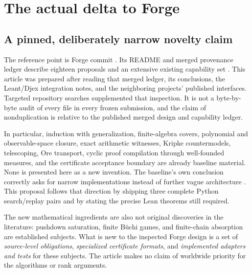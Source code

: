 \section{The actual delta to Forge}
\label{sec:delta}

\subsection{A pinned, deliberately narrow novelty claim}
The reference point is Forge commit
. Its README and merged
provenance ledger describe eighteen proposals and an extensive existing
capability set \cite{forge,forge-provenance}. This article was prepared after
reading that merged ledger, its conclusions, the Leant/Djex integration notes,
and the neighboring projects' published interfaces. Targeted repository
searches supplemented that inspection. It is not a byte-by-byte audit of every
file in every frozen submission, and the claim of nonduplication is relative to
the published merged design and capability ledger.

In particular, induction with generalization, finite-algebra covers, polynomial
and observable-space closure, exact arithmetic witnesses, Kripke countermodels,
telescoping, Ore transport, cyclic proof compilation through well-founded
measures, and the certificate acceptance boundary are already baseline
material. None is presented here as a new invention. The baseline's own
conclusion correctly asks for narrow implementations instead of further vague
architecture \cite{forge-conclusion}. This proposal follows that direction by
shipping three complete Python search/replay pairs and by stating the precise
Lean theorems still required.

The new mathematical ingredients are also not original discoveries in the
literature: pushdown saturation, finite B\"uchi games, and finite-chain
absorption are established subjects. What is new to the inspected Forge design
is a set of \emph{source-level obligations}, \emph{specialized certificate
formats}, and \emph{implemented adapters and tests} for these subjects. The
article makes no claim of worldwide priority for the algorithms or rank
arguments.

